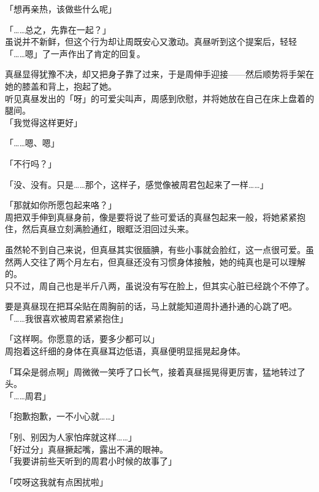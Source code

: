 「想再亲热，该做些什么呢」

「……总之，先靠在一起？」\\

虽说并不新鲜，但这个行为却让周既安心又激动。真昼听到这个提案后，轻轻「……嗯」了一声作出了肯定的回复。

真昼显得犹豫不决，却又把身子靠了过来，于是周伸手迎接——然后顺势将手架在她的膝盖和背上，抱起了她。\\

听见真昼发出的「呀」的可爱尖叫声，周感到欣慰，并将她放在自己在床上盘着的腿间。\\

「我觉得这样更好」

「……嗯、嗯」

「不行吗？」

「没、没有。只是……那个，这样子，感觉像被周君包起来了一样……」

「那就如你所愿包起来咯？」\\

周把双手伸到真昼身前，像是要将说了些可爱话的真昼包起来一般，将她紧紧抱住，然后真昼立刻满脸通红，眼眶泛泪回过头来。

虽然轮不到自己来说，但真昼其实很腼腆，有些小事就会脸红，这一点很可爱。虽然两人交往了两个月左右，但真昼还没有习惯身体接触，她的纯真也是可以理解的。\\

只不过，周自己也是半斤八两，虽说没有写在脸上，但其实心脏已经跳个不停了。

要是真昼现在把耳朵贴在周胸前的话，马上就能知道周扑通扑通的心跳了吧。\\

「……我很喜欢被周君紧紧抱住」

「这样啊。你愿意的话，要多少都可以」\\

周抱着这纤细的身体在真昼耳边低语，真昼便明显摇晃起身体。

「耳朵是弱点啊」周微微一笑呼了口长气，接着真昼摇晃得更厉害，猛地转过了头。\\

「……周君」

「抱歉抱歉，一不小心就……」

「别、别因为人家怕痒就这样……」\\

「好过分」真昼撅起嘴，露出不满的眼神。\\

「我要讲前些天听到的周君小时候的故事了」

「哎呀这我就有点困扰啦」\\

